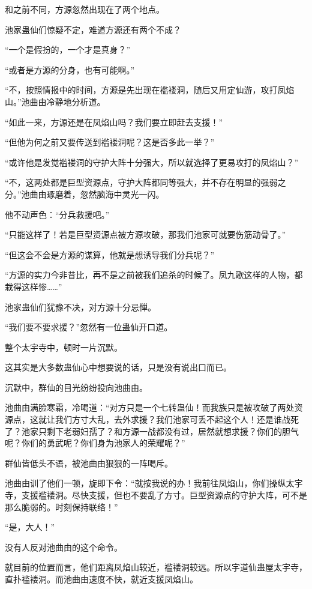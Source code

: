\begin{this_body}
和之前不同，方源忽然出现在了两个地点。

池家蛊仙们惊疑不定，难道方源还有两个不成？

“一个是假扮的，一个才是真身？”

“或者是方源的分身，也有可能啊。”

“不，按照情报中的时间，方源是先出现在褴褛洞，随后又用定仙游，攻打凤焰山。”池曲由冷静地分析道。

“如此一来，方源还是在凤焰山吗？我们要立即赶去支援！”

“但他为何之前又要传送到褴褛洞呢？这是否多此一举？”

“或许他是发觉褴褛洞的守护大阵十分强大，所以就选择了更易攻打的凤焰山？”

“不，这两处都是巨型资源点，守护大阵都同等强大，并不存在明显的强弱之分。”池曲由琢磨着，忽然脑海中灵光一闪。

他不动声色：“分兵救援吧。”

“只能这样了！若是巨型资源点被方源攻破，那我们池家可就要伤筋动骨了。”

“但这会不会是方源的谋算，他就是想诱导我们分兵呢？”

“方源的实力今非昔比，再不是之前被我们追杀的时候了。凤九歌这样的人物，都栽得这样惨……”

池家蛊仙们犹豫不决，对方源十分忌惮。

“我们要不要求援？”忽然有一位蛊仙开口道。

整个太宇寺中，顿时一片沉默。

这其实是大多数蛊仙心中想要说的话，只是没有说出口而已。

沉默中，群仙的目光纷纷投向池曲由。

池曲由满脸寒霜，冷喝道：“对方只是一个七转蛊仙！而我族只是被攻破了两处资源点，这就让我们方寸大乱，去外求援？我们池家可丢不起这个人！还是谁战死了？池家只剩下老弱妇孺了？和方源一战都没有过，居然就想求援？你们的胆气呢？你们的勇武呢？你们身为池家人的荣耀呢？”

群仙皆低头不语，被池曲由狠狠的一阵喝斥。

池曲由训了他们一顿，旋即下令：“就按我说的办！我前往凤焰山，你们操纵太宇寺，支援褴褛洞。尽快支援，但也不要乱了方寸。巨型资源点的守护大阵，可不是那么脆弱的。时刻保持联络！”

“是，大人！”

没有人反对池曲由的这个命令。

就目前的位置而言，他们距离凤焰山较近，褴褛洞较远。所以宇道仙蛊屋太宇寺，直扑褴褛洞。而池曲由速度不快，就近支援凤焰山。

\end{this_body}

